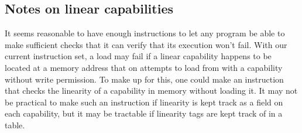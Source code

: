 \documentclass[a4paper]{article}
\begin{document}



\subsection{Notes on linear capabilities}
It seems reasonable to have enough instructions to let any program be able to make sufficient checks that it can verify that its execution won't fail.
With our current instruction set, a load may fail if a linear capability happens to be located at a memory address that on attempts to load from with a capability without write permission.
To make up for this, one could make an instruction that checks the linearity of a capability in memory without loading it.
It may not be practical to make such an instruction if linearity is kept track as a field on each capability, but it may be tractable if linearity tags are kept track of in a table.
\end{document}

